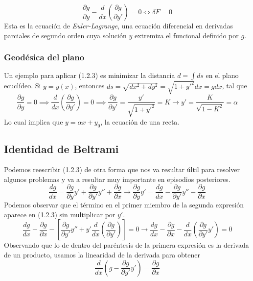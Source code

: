 \vspace{-20pt}
\Large\begin{equation} \label{1.2.3}
    \boxed{\frac{\partial g}{\partial y} -\frac{d}{dx}\left(\frac{\partial g}{\partial y'}\right) =0} \iff \delta F =0
\end{equation} \normalsize
Esta es la ecuación de \textit{Euler-Lagrange}, una ecuación diferencial en derivadas parciales de segundo orden cuya solución $y$ extremiza el funcional definido por $g$.
\subsubsection{Geodésica del plano}
Un ejemplo para aplicar (1.2.3) es minimizar la distancia $d=\int{ds}$ en el plano ecuclídeo. Si $y=y(x)$, entonces $ds=\sqrt{dx^2+dy^2}=\sqrt{1+y'^2}dx=g dx$, tal que
\[\frac{\partial g}{\partial y}=0 \implies \frac{d}{dx}\left(\frac{\partial g}{\partial y'}\right)=0 \implies \frac{\partial g}{\partial y'} = \frac{y'}{\sqrt{1+y'^2}}= K \rightarrow y' = \frac{K}{\sqrt{1-K^2}}=\alpha\]
Lo cual implica que $y=\alpha x + y_0$, la ecuación de una recta.

\subsection{Identidad de Beltrami}
Podemos reescribir (1.2.3) de otra forma que nos va resultar últil para resolver algunos problemas y va a resultar muy importante en episodios posteriores.
\[\frac{dg}{dx} = \frac{\partial g}{\partial y} y' + \frac{\partial g}{\partial y'}y'' + \frac{\partial g}{\partial x}\rightarrow \frac{\partial g}{\partial y} y' = \frac{dg}{dx} - \frac{\partial g}{\partial y'}y'' - \frac{\partial g}{\partial x}\]
Podemos observar que el término en el primer miembro de la segunda expresión aparece en (1.2.3) sin multiplicar por $y'$.
\[\frac{dg}{dx} - \frac{\partial g}{\partial x} - \left[\frac{\partial g}{\partial y'}y'' + y' \frac{d}{dx}\left(\frac{\partial g}{\partial y'}\right)\right]=0 \rightarrow \frac{dg}{dx} - \frac{\partial g}{\partial x} - \frac{d}{dx}\left(\frac{\partial g}{\partial y'}y'\right)=0\]
Observando que lo de dentro del paréntesis de la primera expresión es la derivada de un producto, usamos la linearidad de la derivada para obtener
\begin{equation} \label{1.3.4}
    \frac{d}{dx}\left(g -\frac{\partial g}{\partial y'}y'\right)=\frac{\partial g}{\partial x}
\end{equation}

